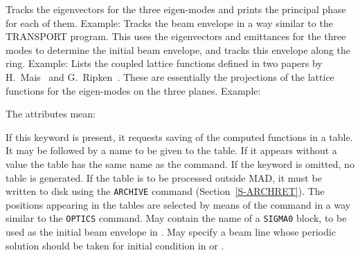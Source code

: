 \begin{mylist}
Tracks the eigenvectors for the three eigen-modes and prints the
principal phase for each of them.
Example:
Tracks the beam envelope in a way similar to the TRANSPORT program.
This uses the eigenvectors and emittances for the three modes to
determine the initial beam envelope,
and tracks this envelope along the ring.
Example:
Lists the coupled lattice functions defined in two papers by
H.~Mais~\cite{B-MAI82} and G.~Ripken~\cite{B-RIP70}.
These are essentially the projections of the lattice functions for the
eigen-modes on the three planes.
Example:
\end{mylist}

The attributes mean:

\begin{mylist}
If this keyword is present,
it requests saving of the computed functions in a table.
It may be followed by a name to be given to the table.
If it appears without a value the table has the same name as the
command.
If the  keyword is omitted, no table is generated.
If the table is to be processed outside MAD, it must be written to
disk using the {\tt ARCHIVE} command (Section~\ref{S-ARCHRET}).
The positions appearing in the tables are selected by means of the
command
in a way similar to the {\tt OPTICS} command.
May contain the name of a {\tt SIGMA0} block,
to be used as the initial beam envelope in .
May specify a beam line whose periodic solution should be taken for
initial condition in  or .
\end{mylist}

